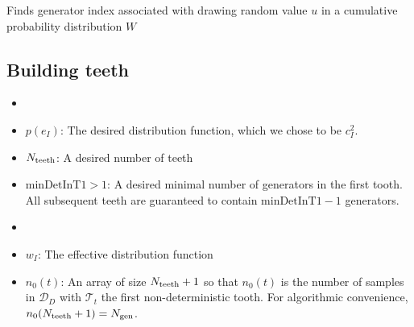 \documentclass[./thesis.tex]{subfiles}
\newcommand{\minDetInT}{\text{minDetInT1}}
\begin{document}
\begin{algorithm}
\caption[FIND\_SAMPLE]{Finds generator index associated with drawing random value $u$ in a cumulative probability distribution $W$}
\label{alg:FIND_SAMPLE}

	
	
\end{algorithm}
\begin{description}

\subsection{Building teeth}

\item[Input] 
\begin{itemize}
\item[] \phantom{pouet}
\item $p(e_I)$:
The desired distribution function, which we chose to be $c_I^2$.
\item $N_\text{teeth}$:
A desired number of teeth
\item $\minDetInT > 1$:
A desired minimal number of generators in the first tooth. All subsequent teeth are guaranteed to contain $\minDetInT-1$ generators.
\end{itemize}

\item[Output] 
\begin{itemize}
\item[] \phantom{pouet}
\item $w_I$:
The effective distribution function
\item $n_0(t)$:
An array of size $N_\text{teeth}+1$ so that $n_0(t)$ is the number of samples in $\mathcal{D}_D$ with $\mathcal{T}_t$ the first non-deterministic tooth. For algorithmic convenience, $n_0(N_\text{teeth}+1)={N_\text{gen}}$.
\end{itemize}
\end{description}
\end{document}
